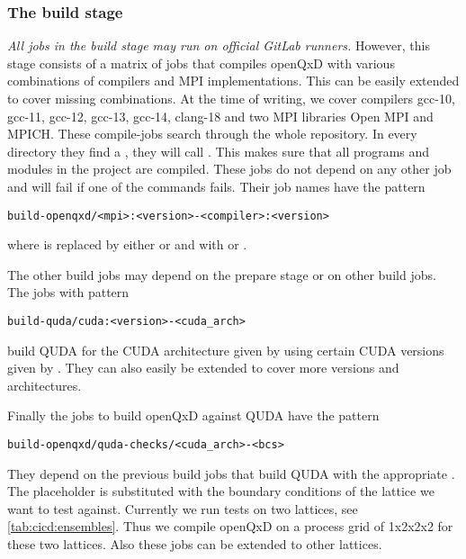 \subsubsection{The build stage}
\label{sec:cicd:pipeline:gitlab:build}

\emph{All jobs in the build stage may run on official GitLab runners.} However, this stage consists of a matrix of jobs that compiles openQxD with various combinations of compilers and MPI implementations. This can be easily extended to cover missing combinations. At the time of writing, we cover compilers gcc-10, gcc-11, gcc-12, gcc-13, gcc-14, clang-18 and two MPI libraries Open MPI\cite{online:openmpi} and MPICH\cite{online:mpich}. These compile-jobs search through the whole repository. In every directory they find a , they will call . This makes sure that all programs and modules in the project are compiled. These jobs do not depend on any other job and will fail if one of the commands fails. Their job names have the pattern
\begin{verbatim}
build-openqxd/<mpi>:<version>-<compiler>:<version>
\end{verbatim}
where  is replaced by either  or  and  with  or .

The other build jobs may depend on the prepare stage or on other build jobs. The jobs with pattern
\begin{verbatim}
build-quda/cuda:<version>-<cuda_arch>
\end{verbatim}
build QUDA for the CUDA architecture given by  using certain CUDA versions given by . They can also easily be extended to cover more versions and architectures.

Finally the jobs to build openQxD against QUDA have the pattern
\begin{verbatim}
build-openqxd/quda-checks/<cuda_arch>-<bcs>
\end{verbatim}
They depend on the previous build jobs that build QUDA with the appropriate . The placeholder  is substituted with the boundary conditions of the lattice we want to test against. Currently we run tests on two lattices, see \cref{tab:cicd:ensembles}. Thus we compile openQxD on a process grid of 1x2x2x2 for these two lattices. Also these jobs can be extended to other lattices.

